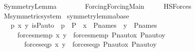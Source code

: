 %
\begin{isabellebody}%
%
%
\isadelimtheory
%
\endisadelimtheory
%
\isatagtheory
{}\isamarkupfalse%
\ Symmetry{\isacharunderscore}{\kern0pt}Lemma\isanewline
\ \ \ \isanewline
\ \ \ \ {\isachardoublequoteopen}Forcing{\isacharslash}{\kern0pt}Forcing{\isacharunderscore}{\kern0pt}Main{\isachardoublequoteclose}\ \isanewline
\ \ \ \ HS{\isacharunderscore}{\kern0pt}Forces\isanewline
{}%
\endisatagtheory
{\isafoldtheory}%
%
\isadelimtheory
\ \isanewline
%
\endisadelimtheory
\isanewline
{}\isamarkupfalse%
\ M{\isacharunderscore}{\kern0pt}symmetric{\isacharunderscore}{\kern0pt}system\isanewline
{}\isanewline
\isanewline
{}\isamarkupfalse%
\ symmetry{\isacharunderscore}{\kern0pt}lemma{\isacharunderscore}{\kern0pt}base\ {\isacharcolon}{\kern0pt}\ \isanewline
\ \ {\isachardoublequoteopen}{\isasymAnd}{\isasympi}\ p\ x\ y{\isachardot}{\kern0pt}\ is{\isacharunderscore}{\kern0pt}P{\isacharunderscore}{\kern0pt}auto{\isacharparenleft}{\kern0pt}{\isasympi}{\isacharparenright}{\kern0pt}\ {\isasymLongrightarrow}\ p\ {\isasymin}\ P\ {\isasymLongrightarrow}\ x\ {\isasymin}\ P{\isacharunderscore}{\kern0pt}names\ {\isasymLongrightarrow}\ y\ {\isasymin}\ P{\isacharunderscore}{\kern0pt}names\ \isanewline
\ \ \ \ {\isasymLongrightarrow}\ {\isacharparenleft}{\kern0pt}forces{\isacharunderscore}{\kern0pt}mem{\isacharparenleft}{\kern0pt}p{\isacharcomma}{\kern0pt}\ x{\isacharcomma}{\kern0pt}\ y{\isacharparenright}{\kern0pt}\ {\isasymlongleftrightarrow}\ forces{\isacharunderscore}{\kern0pt}mem{\isacharparenleft}{\kern0pt}{\isasympi}{\isacharbackquote}{\kern0pt}p{\isacharcomma}{\kern0pt}\ Pn{\isacharunderscore}{\kern0pt}auto{\isacharparenleft}{\kern0pt}{\isasympi}{\isacharparenright}{\kern0pt}{\isacharbackquote}{\kern0pt}x{\isacharcomma}{\kern0pt}\ Pn{\isacharunderscore}{\kern0pt}auto{\isacharparenleft}{\kern0pt}{\isasympi}{\isacharparenright}{\kern0pt}{\isacharbackquote}{\kern0pt}y{\isacharparenright}{\kern0pt}{\isacharparenright}{\kern0pt}\isanewline
\ \ \ \ \ \ {\isasymand}\ {\isacharparenleft}{\kern0pt}forces{\isacharunderscore}{\kern0pt}eq{\isacharparenleft}{\kern0pt}p{\isacharcomma}{\kern0pt}\ x{\isacharcomma}{\kern0pt}\ y{\isacharparenright}{\kern0pt}\ {\isasymlongleftrightarrow}\ forces{\isacharunderscore}{\kern0pt}eq{\isacharparenleft}{\kern0pt}{\isasympi}{\isacharbackquote}{\kern0pt}p{\isacharcomma}{\kern0pt}\ Pn{\isacharunderscore}{\kern0pt}auto{\isacharparenleft}{\kern0pt}{\isasympi}{\isacharparenright}{\kern0pt}{\isacharbackquote}{\kern0pt}x{\isacharcomma}{\kern0pt}\ Pn{\isacharunderscore}{\kern0pt}auto{\isacharparenleft}{\kern0pt}{\isasympi}{\isacharparenright}{\kern0pt}{\isacharbackquote}{\kern0pt}y{\isacharparenright}{\kern0pt}{\isacharparenright}{\kern0pt}{\isachardoublequoteclose}\isanewline

\end{isabellebody}

